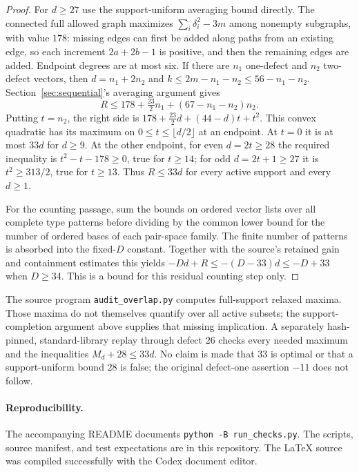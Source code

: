 \documentclass[11pt]{article}
\begin{document}
\begin{proof}
For $d\ge27$ use the support-uniform averaging bound directly. The
connected full allowed graph maximizes $\sum_i\delta_i^2-3m$ among
nonempty subgraphs, with value $178$: missing edges can first be added
along paths from an existing edge, so each increment $2a+2b-1$ is
positive, and then the remaining edges are added. Endpoint degrees are
at most six. If there are $n_1$ one-defect and $n_2$ two-defect vectors,
then $d=n_1+2n_2$ and $k\le2m-n_1-n_2\le56-n_1-n_2$.
Section~\ref{sec:sequential}'s averaging argument gives
\[
 R\le178+\tfrac{23}{2}n_1+(67-n_1-n_2)n_2.
\]
Putting $t=n_2$, the right side is
$178+\tfrac{23}{2}d+(44-d)t+t^2$. This convex quadratic has its maximum
on $0\le t\le\lfloor d/2\rfloor$ at an endpoint. At $t=0$ it is at most
$33d$ for $d\ge9$. At the other endpoint, for even $d=2t\ge28$ the
required inequality is $t^2-t-178\ge0$, true for $t\ge14$; for odd
$d=2t+1\ge27$ it is $t^2\ge313/2$, true for $t\ge13$.
Thus $R\le33d$ for every active support and every $d\ge1$.

For the counting passage, sum the bounds on ordered vector lists over
all complete type patterns before dividing by the common lower bound
for the number of ordered bases of each pair-space family. The finite
number of patterns is absorbed into the fixed-$D$ constant. Together
with the source's retained gain and containment estimates this yields
$-Dd+R\le-(D-33)d\le-D+33$ when $D\ge34$. This is a bound for this
residual counting step only.
\end{proof}

The source program \texttt{audit\_overlap.py} computes full-support relaxed
maxima. Those maxima do not themselves quantify over all active subsets;
the support-completion argument above supplies that missing implication.
A separately hash-pinned, standard-library replay through defect $26$
checks every needed maximum and the inequalities $M_d+28\le33d$.
No claim is made that $33$ is optimal or that a support-uniform bound $28$
is false; the original defect-one assertion $-11$ does not follow.

\paragraph{Reproducibility.}
The accompanying README documents \texttt{python -B run\_checks.py}.
The scripts, source manifest, and test expectations are in this repository.
The LaTeX source was compiled successfully with the Codex document editor.
\end{document}
